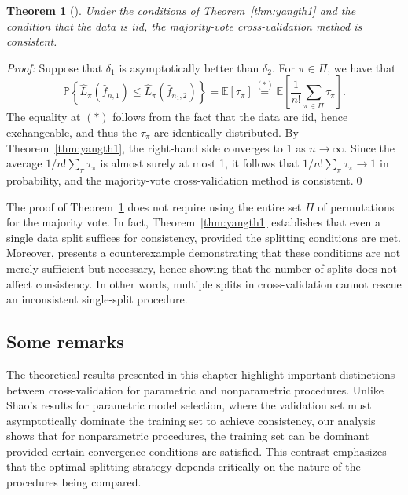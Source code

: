 \documentclass[11pt, letter paper]{article}
\newcommand{\1}{\mathmybb{1}}
\newtheorem{theorem}[proposition]{Theorem}
\newcommand{\0}{\emptyset}
\newcommand{\prob}{\mathbb{P}}
\newcommand{\Ep}[1]{\mathbb{E}\left[ #1 \right]}
\newcommand{\paren}[1]{\left(#1 \right)}
\newcommand{\set}[1]{\left\{ #1 \right\}}
\newcommand{\fhat}[2]{\hat{f}_{#1, #2}}
\begin{document}
\begin{theorem}[\cite{yang_2007}]\label{thm:yangth2}
    Under the conditions of Theorem~\ref{thm:yangth1} and the condition that the data is iid, the majority-vote cross-validation method is consistent.
\end{theorem}

\begin{myproofbox}
    \textit{Proof: }
    Suppose that \(\delta_{1}\) is asymptotically better than \(\delta_{2}\). For \(\pi\in \Pi\), we have that
    \[\prob\set{\hat{L}_{\pi}\paren{\fhat{n}{1}} \leq \hat{L}_{\pi}\paren{\fhat{n_{1}}{2}}} = \Ep{\tau_{\pi}} \stackrel{(*)}{=} \Ep{\frac{1}{n!}\sum_{\pi\in\Pi}\tau_{\pi}}.\]
    The equality at \((*)\) follows from the fact that the data are iid, hence exchangeable, and thus the \(\tau_\pi\) are identically distributed. By Theorem~\ref{thm:yangth1}, the right-hand side converges to 1 as \(n\to\infty\). Since the average \(1/n! \sum_{\pi}\tau_{\pi}\) is almost surely at most 1, it follows that \(1/n! \sum_{\pi}\tau_{\pi} \to 1\) in probability, and the majority-vote cross-validation method is consistent.\qed{}
\end{myproofbox}

The proof of Theorem~\ref{thm:yangth2} does not require using the entire set \(\Pi\) of permutations for the majority vote. In fact, Theorem~\ref{thm:yangth1} establishes that even a single data split suffices for consistency, provided the splitting conditions are met. Moreover, \textcite{yang_2007} presents a counterexample demonstrating that these conditions are not merely sufficient but necessary, hence showing that the number of splits does not affect consistency. In other words, multiple splits in cross-validation cannot rescue an inconsistent single-split procedure.


\subsection{Some remarks}

The theoretical results presented in this chapter highlight important distinctions between cross-validation for parametric and nonparametric procedures. Unlike Shao's results for parametric model selection, where the validation set must asymptotically dominate the training set to achieve consistency, our analysis shows that for nonparametric procedures, the training set can be dominant provided certain convergence conditions are satisfied. This contrast emphasizes that the optimal splitting strategy depends critically on the nature of the procedures being compared.
\end{document}
